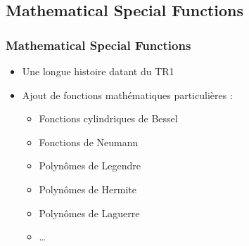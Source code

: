 \documentclass[C++.tex]{subfiles}
\begin{document}
\subsection*{Mathematical Special Functions}
\begin{frame}[fragile]
	\frametitle{Mathematical Special Functions}
	\begin{itemize}
		\item Une longue histoire datant du TR1
		\item Ajout de fonctions mathématiques particulières :
		\begin{itemize}
			\item Fonctions cylindriques de Bessel
			\item Fonctions de Neumann
			\item Polynômes de Legendre
			\item Polynômes de Hermite
			\item Polynômes de Laguerre
			\item \ldots
		\end{itemize}
	\end{itemize}
\end{frame}
\end{document}
